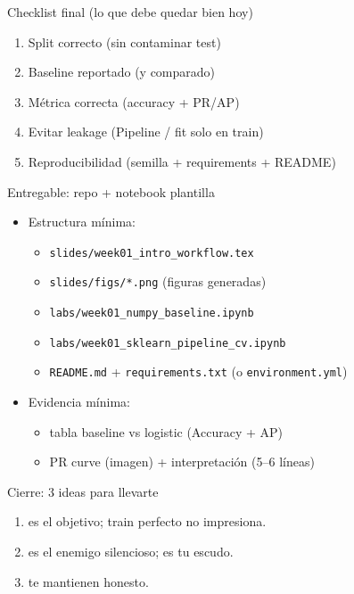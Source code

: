 \begin{frame}{Checklist final (lo que debe quedar bien hoy)}

\begin{enumerate}
  \item Split correcto (sin contaminar test)
  \item Baseline reportado (y comparado)
  \item Métrica correcta (accuracy + PR/AP)
  \item Evitar leakage (Pipeline / fit solo en train)
  \item Reproducibilidad (semilla + requirements + README)
\end{enumerate}
\end{frame}

\begin{frame}{Entregable: repo + notebook plantilla}

\begin{itemize}
  \item Estructura mínima:
  \begin{itemize}
    \item \texttt{slides/week01\_intro\_workflow.tex}
    \item \texttt{slides/figs/*.png} (figuras generadas)
    \item \texttt{labs/week01\_numpy\_baseline.ipynb}
    \item \texttt{labs/week01\_sklearn\_pipeline\_cv.ipynb}
    \item \texttt{README.md} + \texttt{requirements.txt} (o \texttt{environment.yml})
  \end{itemize}
  \item Evidencia mínima:
  \begin{itemize}
    \item tabla baseline vs logistic (Accuracy + AP)
    \item PR curve (imagen) + interpretación (5--6 líneas)
  \end{itemize}
\end{itemize}
\end{frame}

\begin{frame}{Cierre: 3 ideas para llevarte}

\begin{enumerate}
  \item {} es el objetivo; train perfecto no impresiona.
  \item {} es el enemigo silencioso;  es tu escudo.
  \item {} te mantienen honesto.
\end{enumerate}
\end{frame}
